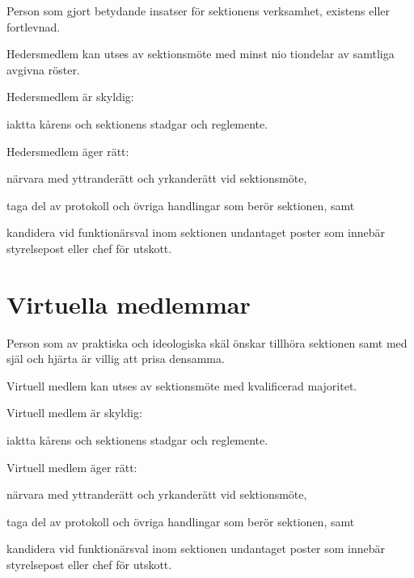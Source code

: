 \documentclass[stadgar]{dsekprotokoll}
\begin{document}
\begin{stadgeavsnitt}


Person som gjort betydande insatser för sektionens verksamhet, existens
eller fortlevnad.


Hedersmedlem kan utses av sektionsmöte med minst nio tiondelar av samtliga
avgivna röster.


Hedersmedlem är skyldig:
\begin{attlista}
\item iaktta kårens och sektionens stadgar och reglemente.
\end{attlista}


Hedersmedlem äger rätt:
\begin{attlista}
\item närvara med yttranderätt och yrkanderätt vid sektionsmöte,
\item taga del av protokoll och övriga handlingar som berör sektionen, samt
\item kandidera vid funktionärsval inom sektionen undantaget poster som innebär styrelsepost eller chef för utskott.
\end{attlista}

\end{stadgeavsnitt}

\section{Virtuella medlemmar}

\begin{stadgeavsnitt}


Person som av praktiska och ideologiska skäl önskar tillhöra sektionen samt
med själ och hjärta är villig att prisa densamma.


Virtuell medlem kan utses av sektionsmöte med kvalificerad majoritet.


Virtuell medlem är skyldig:
\begin{attlista}
\item iaktta kårens och sektionens stadgar och reglemente.
\end{attlista}


Virtuell medlem äger rätt:
\begin{attlista}
\item närvara med yttranderätt och yrkanderätt vid sektionsmöte,
\item taga del av protokoll och övriga handlingar som berör sektionen, samt
\item kandidera vid funktionärsval inom sektionen undantaget poster som
  innebär styrelsepost eller chef för utskott.
\end{attlista}

\end{stadgeavsnitt}
\end{document}

